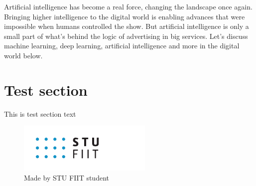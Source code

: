 \documentclass[10pt,twoside,a4paper,english]{article}
\begin{document}
	Artificial intelligence has become a real force, changing the landscape once again. Bringing higher intelligence to the digital world is enabling advances that were impossible when humans controlled the show. But artificial intelligence is only a small part of what's behind the logic of advertising in big services. Let's discuss machine learning, deep learning, artificial intelligence and more in the digital world below.\cite{10314235}\par

	\endgroup

	\section{Test section}
	\begingroup
		This is test section text \par

	\endgroup


	\begin{figure}[tbh]
		\centering
		\includegraphics[scale=0.8]{logo_fiit.pdf}
		\caption{Made by STU FIIT student}
	\end{figure}



	
\end{document}
